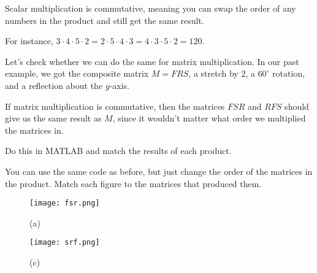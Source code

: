 \documentclass{ximera}
\begin{document}
    \begin{example}

        Scalar multiplication is commutative, meaning you can swap the order of any numbers in the product and still get the same result.

        For instance, $3\cdot 4\cdot 5\cdot 2=2\cdot 5\cdot 4\cdot 3=4\cdot 3\cdot 5\cdot 2=120$.

        Let's check whether we can do the same for matrix multiplication. In our past example, we got the composite matrix $M=FRS$, a stretch by $2$, a $60^\circ$ rotation, and a reflection about the $y$-axis.

        If matrix multiplication is commutative, then the matrices $FSR$ and $RFS$ should give us the same result as $M$, since it wouldn't matter what order we multiplied the matrices in.

        Do this in MATLAB and match the results of each product.

        \begin{hint}

            You can use the same code as before, but just change the order of the matrices in the product. Match each figure to the matrices that produced them.

        \end{hint}

        \begin{figure}[ht!]
            \centering
            \texttt{[image: fsr.png]}
            \caption{(a)}
        \end{figure}
        
        \begin{selectAll}


        \end{selectAll}

        \begin{figure}[ht!]
            \centering
            \texttt{[image: srf.png]}
            \caption{(c)}
        \end{figure}

        \begin{selectAll}



\end{selectAll}
\end{example}
\end{document}
